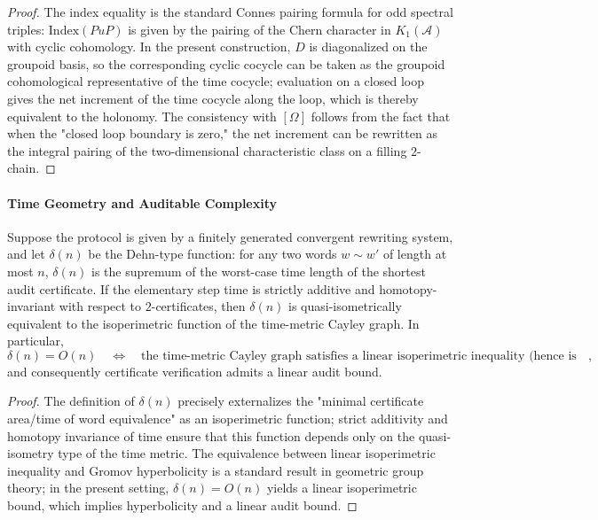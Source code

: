 \begin{proof}
The index equality is the standard Connes pairing formula for odd spectral triples: \(\mathrm{Index}(PuP)\) is given by the pairing of the Chern character in \(K_1(\mathcal A)\) with cyclic cohomology.
In the present construction, \(D\) is diagonalized on the groupoid basis, so the corresponding cyclic cocycle can be taken as the groupoid cohomological representative of the time cocycle; evaluation on a closed loop gives the net increment of the time cocycle along the loop, which is thereby equivalent to the holonomy.
The consistency with \([\Omega]\) follows from the fact that when the "closed loop boundary is zero," the net increment can be rewritten as the integral pairing of the two-dimensional characteristic class on a filling \(2\)-chain.
\end{proof}

\paragraph{Time Geometry and Auditable Complexity}

\begin{theorem}\label{thm:xi-audit-dehn-function-time-geometry}
Suppose the protocol is given by a finitely generated convergent rewriting system, and let \(\delta(n)\) be the Dehn-type function: for any two words \(w\sim w'\) of length at most \(n\), \(\delta(n)\) is the supremum of the worst-case time length of the shortest audit certificate.
If the elementary step time is strictly additive and homotopy-invariant with respect to \(2\)-certificates, then \(\delta(n)\) is quasi-isometrically equivalent to the isoperimetric function of the time-metric Cayley graph.
In particular,
\[
\delta(n)=O(n)
\quad\Longleftrightarrow\quad
\text{the time-metric Cayley graph satisfies a linear isoperimetric inequality (hence is Gromov hyperbolic)},
\]
and consequently certificate verification admits a linear audit bound.
\end{theorem}

\begin{proof}
The definition of \(\delta(n)\) precisely externalizes the "minimal certificate area/time of word equivalence" as an isoperimetric function; strict additivity and homotopy invariance of time ensure that this function depends only on the quasi-isometry type of the time metric.
The equivalence between linear isoperimetric inequality and Gromov hyperbolicity is a standard result in geometric group theory; in the present setting, \(\delta(n)=O(n)\) yields a linear isoperimetric bound, which implies hyperbolicity and a linear audit bound.
\end{proof}

